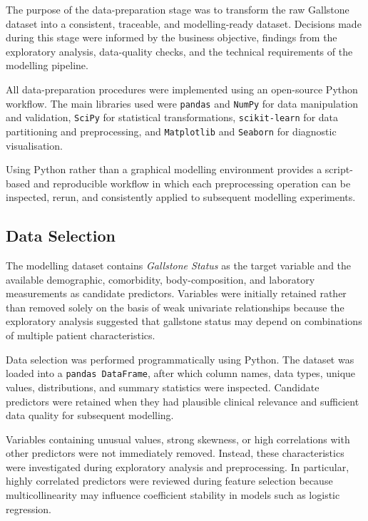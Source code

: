 The purpose of the data-preparation stage was to transform the raw Gallstone
dataset into a consistent, traceable, and modelling-ready dataset. Decisions
made during this stage were informed by the business objective, findings from
the exploratory analysis, data-quality checks, and the technical requirements
of the modelling pipeline.

All data-preparation procedures were implemented using an open-source Python
workflow. The main libraries used were \texttt{pandas} and \texttt{NumPy} for
data manipulation and validation, \texttt{SciPy} for statistical
transformations, \texttt{scikit-learn} for data partitioning and preprocessing,
and \texttt{Matplotlib} and \texttt{Seaborn} for diagnostic visualisation.

Using Python rather than a graphical modelling environment provides a
script-based and reproducible workflow in which each preprocessing operation can
be inspected, rerun, and consistently applied to subsequent modelling
experiments.


\subsection{Data Selection}
\label{subsec:data-selection}

The modelling dataset contains \textit{Gallstone Status} as the target variable
and the available demographic, comorbidity, body-composition, and laboratory
measurements as candidate predictors. Variables were initially retained rather
than removed solely on the basis of weak univariate relationships because the
exploratory analysis suggested that gallstone status may depend on combinations
of multiple patient characteristics.

Data selection was performed programmatically using Python. The dataset was
loaded into a \texttt{pandas DataFrame}, after which column names, data types,
unique values, distributions, and summary statistics were inspected. Candidate
predictors were retained when they had plausible clinical relevance and
sufficient data quality for subsequent modelling.

Variables containing unusual values, strong skewness, or high correlations with
other predictors were not immediately removed. Instead, these characteristics
were investigated during exploratory analysis and preprocessing. In particular,
highly correlated predictors were reviewed during feature selection because
multicollinearity may influence coefficient stability in models such as
logistic regression.

